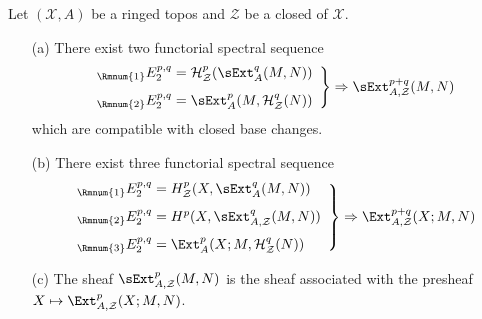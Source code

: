 \begin{proposition}\label{ringed topos sheaf Hom with support closed spectral sequence}
Let $(\mathcal{X},A)$ be a ringed topos and $\mathcal{Z}$ be a closed of $\mathcal{X}$.
\begin{enumerate}
    \item[(a)] There exist two functorial spectral sequence 
    \begin{equation}\label{ringed topos sheaf Hom with support closed spectral sequence-1}
    \left.\begin{array}{l}
    _{\Rmnum{1}}E_2^{p,q}=\mathcal{H}_\mathcal{Z}^p(\sExt_A^q(M,N))\\[8pt]
    _{\Rmnum{2}}E_2^{p,q}=\sExt_A^p(M,\mathcal{H}_\mathcal{Z}^q(N))    
    \end{array}\right\}
    \Rightarrow \sExt_{A,\mathcal{Z}}^{p+q}(M,N)
    \end{equation}
    which are compatible with closed base changes.
    \item[(b)] There exist three functorial spectral sequence 
    \begin{equation}\label{ringed topos sheaf Hom with support closed spectral sequence-2}
    \left.\begin{array}{l}
    _{\Rmnum{1}}E_2^{p,q}=H_\mathcal{Z}^p(X,\sExt_A^q(M,N))\\[8pt]
    _{\Rmnum{2}}E_2^{p,q}=H^p(X,\sExt_{A,\mathcal{Z}}^q(M,N))\\[8pt]
    _{\Rmnum{3}}E_2^{p,q}=\Ext_A^p(X;M,\mathcal{H}_\mathcal{Z}^q(N))
    \end{array}\right\}
    \Rightarrow \Ext_{A,\mathcal{Z}}^{p+q}(X;M,N)
    \end{equation}
    \item[(c)] The sheaf $\sExt_{A,\mathcal{Z}}^p(M,N)$ is the sheaf associated with the presheaf $X\mapsto\Ext_{A,\mathcal{Z}}^p(X;M,N)$.
\end{enumerate}
\end{proposition}
